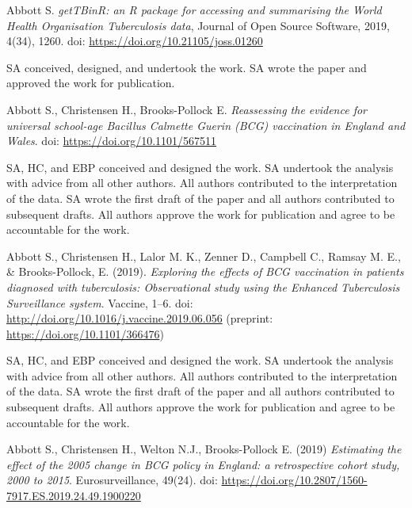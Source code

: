 \documentclass[11pt,twoside]{bristolthesis}
\begin{document}
      \begin{contribution}
      Abbott S. \emph{getTBinR: an R package for accessing and summarising the World Health Organisation Tuberculosis data}, Journal of Open Source Software, 2019, 4(34), 1260. doi: \url{https://doi.org/10.21105/joss.01260}
      
      \par
      
      SA conceived, designed, and undertook the work. SA wrote the paper and approved the work for publication.
      
      \par
      
      Abbott S., Christensen H., Brooks-Pollock E. \emph{Reassessing the evidence for universal school-age Bacillus Calmette Guerin (BCG) vaccination in England and Wales}. doi: \url{https://doi.org/10.1101/567511}
      
      \par
      
      SA, HC, and EBP conceived and designed the work. SA undertook the analysis with advice from all other authors. All authors contributed to the interpretation of the data. SA wrote the first draft of the paper and all authors contributed to subsequent drafts. All authors approve the work for publication and agree to be accountable for the work.
      
      \par
      
      Abbott S., Christensen H., Lalor M. K., Zenner D., Campbell C., Ramsay M. E., \& Brooks-Pollock, E. (2019). \emph{Exploring the effects of BCG vaccination in patients diagnosed with tuberculosis: Observational study using the Enhanced Tuberculosis Surveillance system}. Vaccine, 1--6. doi: \url{http://doi.org/10.1016/j.vaccine.2019.06.056} (preprint: \url{https://doi.org/10.1101/366476})
      
      \par
      
      SA, HC, and EBP conceived and designed the work. SA undertook the analysis with advice from all other authors. All authors contributed to the interpretation of the data. SA wrote the first draft of the paper and all authors contributed to subsequent drafts. All authors approve the work for publication and agree to be accountable for the work.
      
      \par
      
      Abbott S., Christensen H., Welton N.J., Brooks-Pollock E. (2019) \emph{Estimating the effect of the 2005 change in BCG policy in England: a retrospective cohort study, 2000 to 2015}. Eurosurveillance, 49(24). doi: \url{https://doi.org/10.2807/1560-7917.ES.2019.24.49.1900220}
      

\end{contribution}
\end{document}
